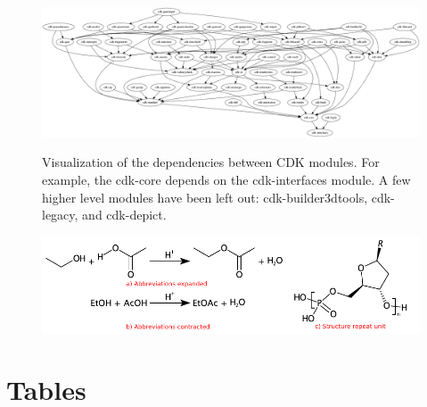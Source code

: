 \documentclass[doublespacing]{bmcart}
\begin{document}
\begin{backmatter}
\begin{figure}[h!]
  \caption{
    Visualization of the dependencies between CDK modules. For example,
    the cdk-core depends on the cdk-interfaces module. A few higher level
    modules have been left out: cdk-builder3dtools, cdk-legacy, and
    cdk-depict.}
  \centering
  \includegraphics[width=\textwidth]{cdkDeps.png}
  \label{fig:deps}
\end{figure}

\begin{figure}[h!]
  \caption{}
  \includegraphics[width=\textwidth]{img/sgroups.pdf}
  \label{fig:sgroups}
\end{figure}
      





\clearpage

\section*{Tables}



\end{backmatter}
\end{document}
